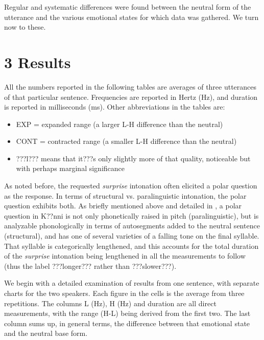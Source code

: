 \documentclass[output=paper]{langsci/langscibook}
\begin{document}
Regular and systematic differences were found between the neutral form of the utterance and the various emotional states for which data was gathered. We turn now to these. 

\section{3 Results }
\begin{styleBodyTextIndent}
All the numbers reported in the following tables are averages of three utterances of that particular sentence. Frequencies are reported in Hertz (Hz), and duration is reported in milliseconds (ms). Other abbreviations in the tables are: 
\end{styleBodyTextIndent}

\begin{itemize}
\item EXP = expanded range (a larger L-H difference than the neutral)
\item CONT = contracted range (a smaller L-H difference than the neutral)
\item ???l??? means that it???s only slightly more of that quality, noticeable but with perhaps marginal significance 
\end{itemize}

As noted before, the requested \emph{surprise} intonation often elicited a polar question as the response. In terms of structural vs. paralinguistic intonation, the polar question exhibits both. As briefly mentioned above and detailed in \citet{Cahill2012}, a polar question in K??nni is not only phonetically raised in pitch (paralinguistic), but is analyzable phonologically in terms of autosegments added to the neutral sentence (structural), and has one of several varieties of a falling tone on the final syllable. That syllable is categorically lengthened, and this accounts for the total duration of the \emph{surprise} intonation being lengthened in all the measurements to follow (thus the label ???longer??? rather than ???slower???).

\begin{styleBodyTextIndent}
We begin with a detailed examination of results from one sentence, with separate charts for the two speakers. Each figure in the cells is the average from three repetitions. The columns L (Hz), H (Hz) and duration are all direct measurements, with the range (H-L) being derived from the first two. The last column sums up, in general terms, the difference between that emotional state and the neutral base form. 
\end{styleBodyTextIndent}
\end{document}
